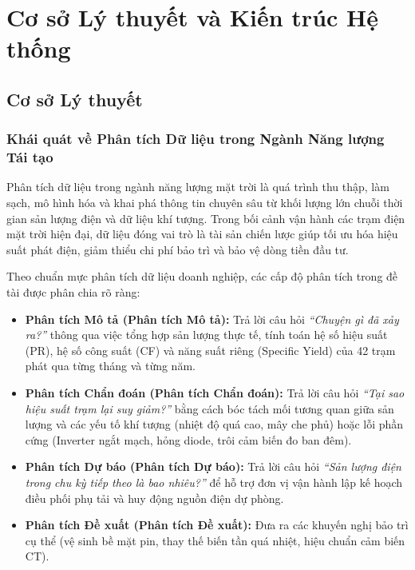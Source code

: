 \chapter{Cơ sở Lý thuyết và Kiến trúc Hệ thống}
\label{chap:lythuyet}

\section{Cơ sở Lý thuyết}
\label{sec:co_so_ly_thuyet}

\subsection{Khái quát về Phân tích Dữ liệu trong Ngành Năng lượng Tái tạo}
Phân tích dữ liệu trong ngành năng lượng mặt trời là quá trình thu thập, làm sạch, mô hình hóa và khai phá thông tin chuyên sâu từ khối lượng lớn chuỗi thời gian sản lượng điện và dữ liệu khí tượng. Trong bối cảnh vận hành các trạm điện mặt trời hiện đại, dữ liệu đóng vai trò là tài sản chiến lược giúp tối ưu hóa hiệu suất phát điện, giảm thiểu chi phí bảo trì và bảo vệ dòng tiền đầu tư.

Theo chuẩn mực phân tích dữ liệu doanh nghiệp, các cấp độ phân tích trong đề tài được phân chia rõ ràng:
\begin{itemize}[noitemsep]
    \item \textbf{Phân tích Mô tả (Phân tích Mô tả):} Trả lời câu hỏi \textit{``Chuyện gì đã xảy ra?''} thông qua việc tổng hợp sản lượng thực tế, tính toán hệ số hiệu suất (PR), hệ số công suất (CF) và năng suất riêng (Specific Yield) của 42 trạm phát qua từng tháng và từng năm.
    \item \textbf{Phân tích Chẩn đoán (Phân tích Chẩn đoán):} Trả lời câu hỏi \textit{``Tại sao hiệu suất trạm lại suy giảm?''} bằng cách bóc tách mối tương quan giữa sản lượng và các yếu tố khí tượng (nhiệt độ quá cao, mây che phủ) hoặc lỗi phần cứng (Inverter ngắt mạch, hỏng diode, trôi cảm biến đo ban đêm).
    \item \textbf{Phân tích Dự báo (Phân tích Dự báo):} Trả lời câu hỏi \textit{``Sản lượng điện trong chu kỳ tiếp theo là bao nhiêu?''} để hỗ trợ đơn vị vận hành lập kế hoạch điều phối phụ tải và huy động nguồn điện dự phòng.
    \item \textbf{Phân tích Đề xuất (Phân tích Đề xuất):} Đưa ra các khuyến nghị bảo trì cụ thể (vệ sinh bề mặt pin, thay thế biến tần quá nhiệt, hiệu chuẩn cảm biến CT).
\end{itemize}

